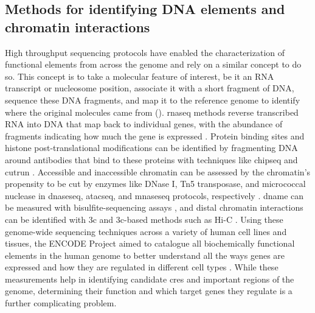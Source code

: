 \subsection{Methods for identifying DNA elements and chromatin interactions}

High throughput sequencing protocols have enabled the characterization of functional elements from across the genome and rely on a similar concept to do so.
This concept is to take a molecular feature of interest, be it an RNA transcript or nucleosome position, associate it with a short fragment of DNA, sequence these DNA fragments, and map it to the reference genome to identify where the original molecules came from ().
\Gls{rnaseq} methods reverse transcribed RNA into DNA that map back to individual genes, with the abundance of fragments indicating how much the gene is expressed \cite{conesaSurveyBestPractices2016}.
Protein binding sites and histone post-translational modifications can be identified by fragmenting DNA around antibodies that bind to these proteins with techniques like \gls{chipseq} and \gls{cutrun} \cite{robertsonGenomewideProfilesSTAT12007,baileyPracticalGuidelinesComprehensive2013,skeneTargetedSituGenomewide2018}.
Accessible and inaccessible chromatin can be assessed by the chromatin's propensity to be cut by enzymes like DNase I, Tn5 transposase, and micrococcal nuclease in \gls{dnaseseq}, \gls{atacseq}, and \gls{mnaseseq} protocols, respectively \cite{boyleHighResolutionMappingCharacterization2008,buenrostroTranspositionNativeChromatin2013,buenrostroATACseqMethodAssaying2015,corcesImprovedATACseqProtocol2017,schonesDynamicRegulationNucleosome2008}.
\Gls{dname} can be measured with bisulfite-sequencing assays \cite{lairdPrinciplesChallengesGenomewide2010}, and distal chromatin interactions can be identified with \gls{3c} and \gls{3c}-based methods such as Hi-C \cite{dekkerCapturingChromosomeConformation2002,liebermanaidenComprehensiveMappingLongRange2009,dixonTopologicalDomainsMammalian2012,noraSpatialPartitioningRegulatory2012,rao3DMapHuman2014}.
Using these genome-wide sequencing techniques across a variety of human cell lines and tissues, the ENCODE Project aimed to catalogue all biochemically functional elements in the human genome to better understand all the ways genes are expressed and how they are regulated in different cell types \cite{birneyIdentificationAnalysisFunctional2007,mooreExpandedEncyclopaediasDNA2020}.
While these measurements help in identifying candidate \glspl{cre} and important regions of the genome, determining their function and which target genes they regulate is a further complicating problem.

